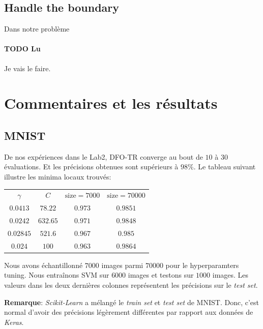 \documentclass[12 pt, a4paper]{article}
\begin{document}
\subsection{Handle the boundary}
Dans notre problème 

\paragraph*{TODO Lu} Je vais le faire. 




\section{Commentaires et les résultats}\label{results}

\subsection{MNIST}

De nos expériences dans le Lab2, DFO-TR converge au bout de $10$ à $30$ évaluations. Et les précisions obtenues sont supérieurs à $98\%$. Le tableau suivant illustre les minima locaux trouvés:

\begin{center}
\begin{tabular}{|c|c|c|c|}
  \hline
  $\gamma$ & $C$ & $\text{size}=7000$ & $\text{size}=70000$ \\
  $0.0413$ & $78.22$ & $0.973$ & $0.9851$ \\
  $0.0242$ & $632.65$ & $0.971$ & $0.9848$ \\
  $0.02845$ & $521.6$ & $0.967$ & $0.985$ \\
  $0.024$ & $100$ & $0.963$ & $0.9864$ \\
  \hline
\end{tabular}
\end{center}
Nous avons échantillonné $7000$ images parmi $70000$ pour le hyperparamters tuning. Nous entraînons SVM sur $6000$ images et testons sur $1000$ images. Les valeurs dans les deux dernières colonnes représentent les précisions sur le \emph{test set}.

\textbf{Remarque}: \textit{Scikit-Learn} a mélangé le \emph{train set} et \emph{test set} de MNIST. Donc, c'est normal d'avoir des précisions légèrement différentes par rapport aux données de \textit{Keras}.



\quad



\end{document}
